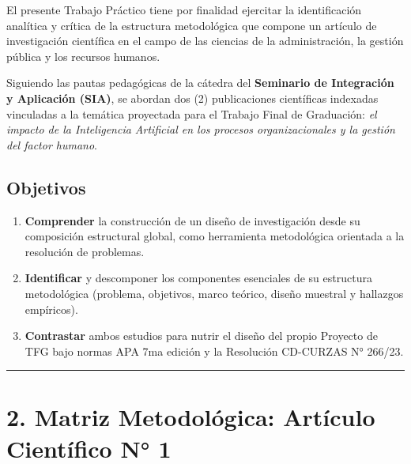 \documentclass[
  spanish,
  letterpaper,
  DIV=11,
  numbers=noendperiod]{scrartcl}
\providecommand{\tightlist}{%
  \setlength{\itemsep}{0pt}\setlength{\parskip}{0pt}}
\begin{document}
El presente Trabajo Práctico tiene por finalidad ejercitar la
identificación analítica y crítica de la estructura metodológica que
compone un artículo de investigación científica en el campo de las
ciencias de la administración, la gestión pública y los recursos
humanos.

Siguiendo las pautas pedagógicas de la cátedra del \textbf{Seminario de
Integración y Aplicación (SIA)}, se abordan dos (2) publicaciones
científicas indexadas vinculadas a la temática proyectada para el
Trabajo Final de Graduación: \emph{el impacto de la Inteligencia
Artificial en los procesos organizacionales y la gestión del factor
humano}.

\subsection{Objetivos}\label{objetivos}

\begin{enumerate}
\def\labelenumi{\arabic{enumi}.}
\tightlist
\item
  \textbf{Comprender} la construcción de un diseño de investigación
  desde su composición estructural global, como herramienta metodológica
  orientada a la resolución de problemas.
\item
  \textbf{Identificar} y descomponer los componentes esenciales de su
  estructura metodológica (problema, objetivos, marco teórico, diseño
  muestral y hallazgos empíricos).
\item
  \textbf{Contrastar} ambos estudios para nutrir el diseño del propio
  Proyecto de TFG bajo normas APA 7ma edición y la Resolución CD-CURZAS
  N° 266/23.
\end{enumerate}

\begin{center}\rule{0.5\linewidth}{0.5pt}\end{center}

\section{2. Matriz Metodológica: Artículo Científico N°
1}\label{matriz-metodoluxf3gica-artuxedculo-cientuxedfico-n-1}
\end{document}
